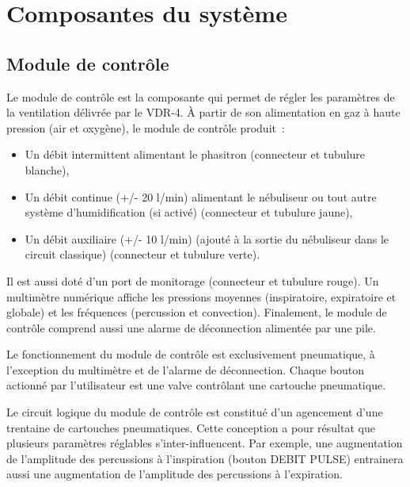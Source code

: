 \chapter{Composantes du système}

%
%
\section{Module de contrôle}

Le module de contrôle est la composante qui permet de régler les paramètres de la ventilation délivrée par le VDR-4. 
À partir de son alimentation en gaz à haute pression (air et oxygène), le module de contrôle produit :

\begin{itemize}
	\item Un débit intermittent alimentant le phasitron (connecteur et tubulure blanche),
	\item Un débit continue (+/- 20 l/min) alimentant le nébuliseur ou tout autre système d’humidification (si activé) (connecteur et tubulure jaune),
	\item Un débit auxiliaire (+/- 10 l/min) (ajouté à la sortie du nébuliseur dans le circuit classique) (connecteur et tubulure verte).
\end{itemize}

Il est aussi doté d’un port de monitorage (connecteur et tubulure rouge). Un multimètre numérique affiche les pressions moyennes (inspiratoire, expiratoire et globale) et les fréquences (percussion et convection). Finalement, le module de contrôle comprend aussi une alarme de déconnection alimentée par une pile.

Le fonctionnement du module de contrôle est exclusivement pneumatique, à l’exception du multimètre et de l’alarme de déconnection. Chaque bouton actionné par l’utilisateur est une valve contrôlant une cartouche pneumatique. 

Le circuit logique du module de contrôle est constitué d’un agencement d’une trentaine de cartouches pneumatiques. Cette conception a pour résultat que plusieurs paramètres réglables s’inter-influencent. Par exemple, une augmentation de l’amplitude des percussions à l’inspiration (bouton DEBIT PULSE) entrainera aussi une augmentation  de l’amplitude des percussions à l’expiration.

